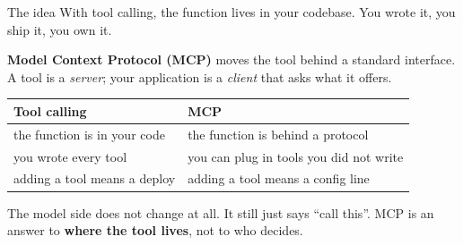 \documentclass[aspectratio=169]{beamer}
\newcommand{\keybox}[1]{%
  \begin{tcolorbox}[colback=armblue!8, colframe=armblue, boxrule=0.6pt, arc=2pt]
  #1
  \end{tcolorbox}}
\begin{document}
\begin{frame}{The idea}
  \vspace{0.3em}
  With tool calling, the function lives in your codebase. You wrote it, you ship it, you own it.

  \vspace{0.4em}
  \textbf{Model Context Protocol (MCP)} moves the tool behind a standard interface. A tool is a
  \emph{server}; your application is a \emph{client} that asks what it offers.

  \vspace{0.4em}
  \begin{center}
  \small
  \begin{tabular}{ll}
    \toprule
    \textbf{Tool calling} & \textbf{MCP} \\
    \midrule
    the function is in your code & the function is behind a protocol \\
    you wrote every tool & you can plug in tools you did not write \\
    adding a tool means a deploy & adding a tool means a config line \\
    \bottomrule
  \end{tabular}
  \end{center}

  \vspace{0.35em}
  \keybox{The model side does not change at all. It still just says ``call this''. MCP is an
  answer to \textbf{where the tool lives}, not to who decides.}
\end{frame}
\end{document}
